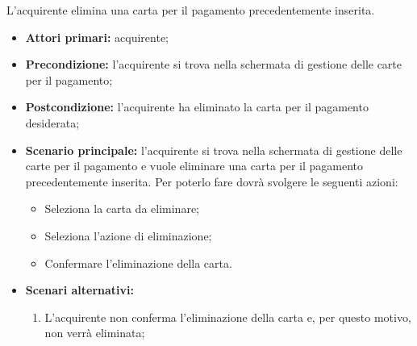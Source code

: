 
L'acquirente elimina una carta per il pagamento precedentemente inserita.
\begin{itemize}
    \item \textbf{Attori primari:} acquirente;
    \item \textbf{Precondizione:} l'acquirente si trova nella schermata di gestione delle carte per il pagamento;
    \item \textbf{Postcondizione:} l'acquirente ha eliminato la carta per il pagamento desiderata;
    \item \textbf{Scenario principale:} l'acquirente si trova nella schermata di gestione delle carte per il pagamento e vuole eliminare una carta per il pagamento precedentemente inserita. Per poterlo fare dovrà svolgere le seguenti azioni:
    \begin{itemize}
        \item Seleziona la carta da eliminare;
        \item Seleziona l'azione di eliminazione;
        \item Confermare l'eliminazione della carta.
    \end{itemize}
    \item \textbf{Scenari alternativi:}
    \begin{enumerate}[label=\lett]
        \item L'acquirente non conferma l'eliminazione della carta e, per questo motivo, non verrà eliminata;
    \end{enumerate}
\end{itemize}

